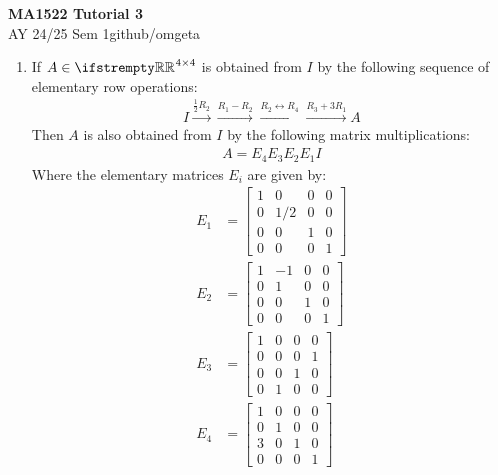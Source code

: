 \documentclass[12pt, a4paper]{article}
\newcommand{\mytitle}{MA1522 Tutorial 3}
\newcommand{\myauthor}{github/omgeta}
\newcommand{\mydate}{AY 24/25 Sem 1}
\begin{document}
\raggedright
\footnotesize
\begin{center}
{\normalsize{\textbf{\mytitle}}} \\
{\footnotesize{\mydate\hspace{2pt}\textemdash\hspace{2pt}\myauthor}}
\end{center}

\begin{enumerate}[Q\arabic*.]
  \item If $A \in \RR^{4\times4}$ is obtained from $I$ by the following sequence of elementary row operations:
    \begin{align*}
      I \xrightarrow{\frac{1}{2}R_2}\xrightarrow{R_1-R_2}\xrightarrow{R_2\leftrightarrow R_4}\xrightarrow{R_3+3R_1}A
    \end{align*}
    Then $A$ is also obtained from $I$ by the following matrix multiplications:
    \begin{align*}
      A = E_4E_3E_2E_1I
    \end{align*}
    Where the elementary matrices $E_i$ are given by:
    \begin{align*}
      E_1 &= \begin{bmatrix}1&0&0&0\\0&1/2&0&0\\0&0&1&0\\0&0&0&1\end{bmatrix} \\
      E_2 &= \begin{bmatrix}1&-1&0&0\\0&1&0&0\\0&0&1&0\\0&0&0&1\end{bmatrix} \\
      E_3 &= \begin{bmatrix}1&0&0&0\\0&0&0&1\\0&0&1&0\\0&1&0&0\end{bmatrix} \\
      E_4 &= \begin{bmatrix}1&0&0&0\\0&1&0&0\\3&0&1&0\\0&0&0&1\end{bmatrix} \\

\end{align*}
\end{enumerate}
\end{document}
